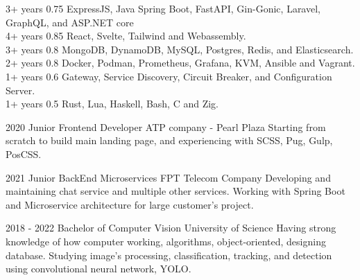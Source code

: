 \documentclass[10pt,A4]{article}
\begin{document}
\begin{paracol}{2}
\begin{leftcolumn}
 {3+ years} {0.75} {ExpressJS, Java Spring Boot, FastAPI, Gin-Gonic, Laravel, GraphQL, and ASP.NET core} \\[-2pt]

 {4+ years} {0.85} {React, Svelte, Tailwind and Webassembly.} \\[-2pt]

 {3+ years} {0.8} {MongoDB, DynamoDB, MySQL, Postgres, Redis, and Elasticsearch.} \\[-2pt]

 {2+ years} {0.8} {Docker, Podman, Prometheus, Grafana, KVM, Ansible and Vagrant.} \\[-2pt]

 {1+ years} {0.6} {Gateway, Service Discovery, Circuit Breaker, and Configuration Server.} \\[-2pt]

 {1+ years} {0.5} {Rust, Lua, Haskell, Bash, C and Zig.} \\[-2pt]

\end{leftcolumn}
\begin{rightcolumn}


\cvevent
	{2020}
	{Junior Frontend Developer}
	{ATP company - Pearl Plaza}
	{Starting from scratch to build main landing page, and experiencing with SCSS, Pug, Gulp, PosCSS.}
    
\cvevent
    {2021}
    {Junior BackEnd Microservices}
    {FPT Telecom Company}
    {Developing and maintaining chat service and multiple other services. Working with Spring Boot and Microservice architecture for large customer's project.}

{}

\cvevent
	{2018 - 2022}
	{Bachelor of Computer Vision}
	{University of Science}
	{Having strong knowledge of how computer working, algorithms, object-oriented, designing database. Studying image's processing, classification, tracking, and detection using convolutional neural network, YOLO.}


\end{rightcolumn}
\end{paracol}
\end{document}
